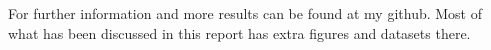 \cite{onsager}


For further information and more results can be found at my github. Most of what has been discussed in this report has extra figures and datasets there. 